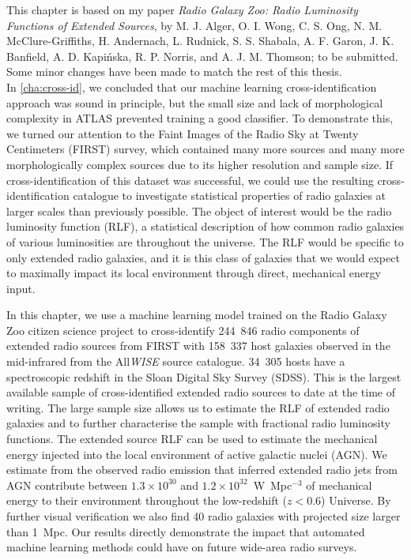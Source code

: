 \documentclass[11pt, a4paper]{book}
\newcommand{\ncomponents}{244~846}
\newcommand{\nsources}{158~337}
\newcommand{\nsourceszsp}{34~305}
\newcommand{\nnewgiants}{40}
\begin{document}
This chapter is based on my paper \emph{Radio Galaxy Zoo: Radio Luminosity Functions of Extended Sources}, by M. J. Alger, O. I. Wong, C. S. Ong, N. M. McClure-Griffiths, H. Andernach, L. Rudnick, S. S. Shabala, A. F. Garon, J. K. Banfield, A. D. Kapi\'nska, R. P. Norris, and A. J. M. Thomson; to be submitted. Some minor changes have been made to match the rest of this thesis.\\

In \autoref{cha:cross-id}, we concluded that our machine learning cross-identification approach was sound in principle, but the small size and lack of morphological complexity in ATLAS prevented training a good classifier. To demonstrate this, we turned our attention to the Faint Images of the Radio Sky at Twenty Centimeters (FIRST) survey, which contained many more sources and many more morphologically complex sources due to its higher resolution and sample size. If cross-identification of this dataset was successful, we could use the resulting cross-identification catalogue to investigate statistical properties of radio galaxies at larger scales than previously possible. The object of interest would be the radio luminosity function (RLF), a statistical description of how common radio galaxies of various luminosities are throughout the universe. The RLF would be specific to only extended radio galaxies, and it is this class of galaxies that we would expect to maximally impact its local environment through direct, mechanical energy input.

In this chapter, we use a machine learning model trained on the Radio Galaxy Zoo citizen science project to cross-identify \ncomponents{} radio components of extended radio sources from FIRST with \nsources{} host galaxies observed in the mid-infrared from the All\emph{WISE} source catalogue. \nsourceszsp{} hosts have a spectroscopic redshift in the Sloan Digital Sky Survey (SDSS). This is the largest available sample of cross-identified extended radio sources to date at the time of writing. The large sample size allows us to estimate the RLF of extended radio galaxies and to further characterise the sample with fractional radio luminosity functions. The extended source RLF can be used to estimate the mechanical energy injected into the local environment of active galactic nuclei (AGN). We estimate from the observed radio emission that inferred extended radio jets from AGN contribute between $1.3 \times 10^{30}$ and $1.2 \times 10^{32}$~W~Mpc$^{-3}$ of mechanical energy to their environment throughout the low-redshift ($z < 0.6$) Universe. By further visual verification we also find \nnewgiants{} radio galaxies with projected size larger than 1~Mpc. Our results directly demonstrate the impact that automated machine learning methods could have on future wide-area radio surveys.
\end{document}
